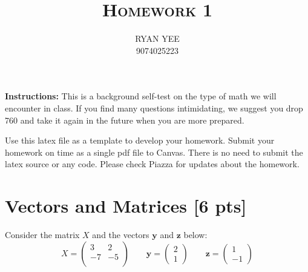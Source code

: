 \documentclass[a4paper]{article}
\title{\textsc{Homework 1}} %
\author{
	{RYAN YEE} \\
	{9074025223}\\
}
\date{}
\theoremstyle{definition}
\begin{document}
	
	\maketitle 
	
	
	\textbf{Instructions:} 
	This is a background self-test on the type of math we will encounter in class. If you find many questions intimidating, we suggest you drop 760 and take it again in the future when you are more prepared.
	
	Use this latex file as a template to develop your homework.
	Submit your homework on time as a single pdf file to Canvas.
	There is no need to submit the latex source or any code.
	Please check Piazza for updates about the homework.
	
	
	\section{Vectors and Matrices [6 pts]}
	Consider the matrix $X$ and the vectors $\mathbf{y}$ and $\textbf{z}$ below:
	$$
	X = \begin{pmatrix}
		3 & 2 \\ -7 & -5 \\
	\end{pmatrix}
	\qquad \mathbf{y} = \begin{pmatrix}
		2 \\ 1
	\end{pmatrix} \qquad \mathbf{z} = \begin{pmatrix}
		1 \\ -1
	\end{pmatrix}
	$$
\end{document}
